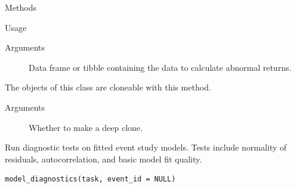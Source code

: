 \documentclass[a4paper]{book}
\begin{document}
\begin{Section}{Methods}
\begin{SubSection}{}
\begin{SubSubSection}{Usage}
\end{SubSubSection}

%
\begin{SubSubSection}{Arguments}

\begin{description}

\item[] Data frame or tibble containing the data to calculate abnormal returns.

\end{description}



\end{SubSubSection}

\end{SubSection}




\hypertarget{method-ModelBase-clone}{}
%
\begin{SubSection}{}
The objects of this class are cloneable with this method.
%

%
\begin{SubSubSection}{Arguments}

\begin{description}

\item[] Whether to make a deep clone.

\end{description}



\end{SubSubSection}

\end{SubSection}


\end{Section}
%
\begin{Description}
Run diagnostic tests on fitted event study models. Tests include
normality of residuals, autocorrelation, and basic model fit quality.
\end{Description}
%
\begin{Usage}
\begin{verbatim}
model_diagnostics(task, event_id = NULL)
\end{verbatim}
\end{Usage}
\end{document}

